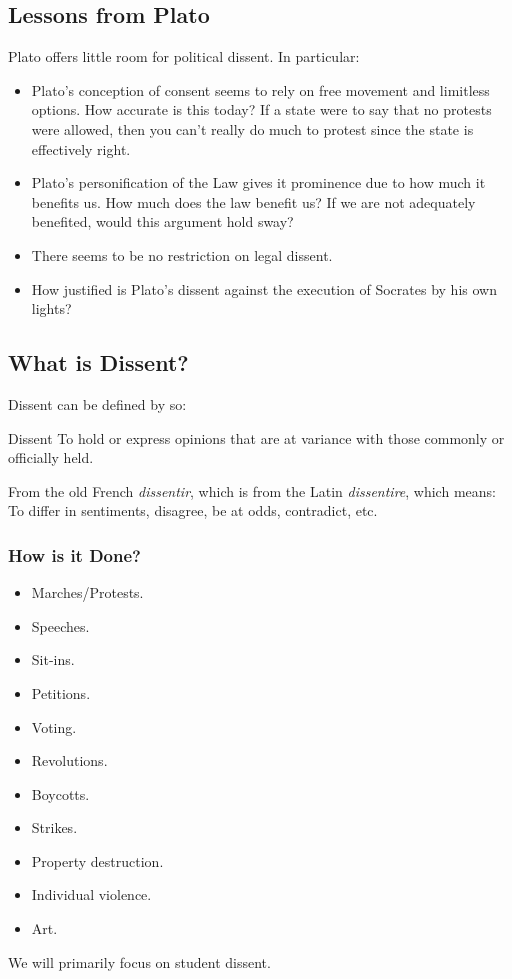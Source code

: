 \documentclass[letterpaper]{article}
\begin{document}
\subsection{Lessons from Plato}
Plato offers little room for political dissent. In particular: 
\begin{itemize}
    \item Plato's conception of consent seems to rely on free movement and limitless options. How accurate is this today? If a state were to say that no protests were allowed, then you can't really do much to protest since the state is effectively right. 
    \item Plato's personification of the Law gives it prominence due to how much it benefits us. How much does the law benefit us? If we are not adequately benefited, would this argument hold sway? 
    \item There seems to be no restriction on legal dissent. 
    \item How justified is Plato's dissent against the execution of Socrates by his own lights? 
\end{itemize}

\subsection{What is Dissent?}
Dissent can be defined by so: 
\begin{definition}{Dissent}{}
    To hold or express opinions that are at variance with those commonly or officially held. 
\end{definition}

From the old French \emph{dissentir}, which is from the Latin \emph{dissentire}, which means: To differ in sentiments, disagree, be at odds, contradict, etc. 

\subsubsection{How is it Done?}
\begin{itemize}
    \item Marches/Protests. 
    \item Speeches.
    \item Sit-ins. 
    \item Petitions. 
    \item Voting. 
    \item Revolutions.
    \item Boycotts. 
    \item Strikes. 
    \item Property destruction. 
    \item Individual violence.
    \item Art.  
\end{itemize}
We will primarily focus on student dissent. 
\end{document}
